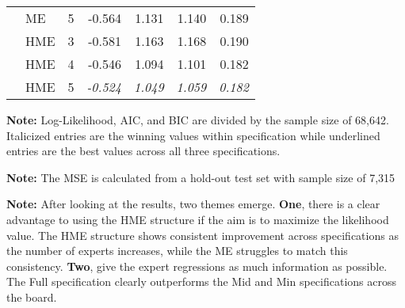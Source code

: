 \documentclass[12pt]{article}
\begin{document}
\begin{table}
\begin{threeparttable}
{\begin{tabular}[r]{l l l r r r r}
         &  ME   &    5    & -0.564  & 1.131  & 1.140  & 0.189 \\
         &  HME  &    3    & -0.581  & 1.163  & 1.168  & 0.190 \\
         &  HME  &    4    & -0.546  & 1.094  & 1.101  & 0.182 \\
         &  HME  &    5    & \it{-0.524}  & \it{1.049}  & \it{1.059}  & \it{0.182} \\
        \cmidrule(l){1-7}
    \end{tabular}
    }
    \begin{tablenotes}
      \item{\footnotesize \textbf{Note:} Log-Likelihood, AIC, and BIC are divided by the sample size of 68,642.
      Italicized entries are the winning values within specification while underlined entries are the best values across all three specifications.
      }
      \item{\footnotesize \textbf{Note:} The MSE is calculated from a hold-out test set with sample size of 7,315}
      \item{\footnotesize \textbf{Note:} After looking at the results, two themes emerge. \textbf{One}, there is a clear advantage to using the HME structure if the aim is to maximize the likelihood value.
      The HME structure shows consistent improvement across specifications as the number of experts increases,
      while the ME struggles to match this consistency. \textbf{Two}, give the expert regressions as much information as possible. The Full specification clearly outperforms the Mid and Min specifications across the board.
      }
      \item{\footnotesize }
    \end{tablenotes} \label{tbl:model_comparison}
  \end{threeparttable}
\end{table}
\end{document}
